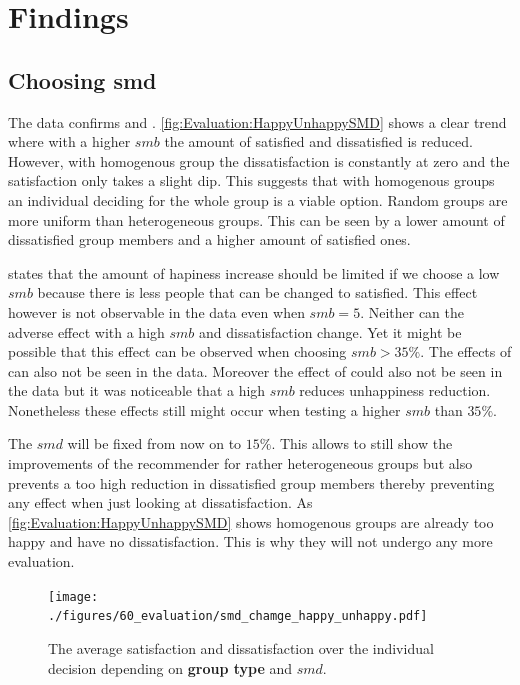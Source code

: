 \section{Findings}
\label{sec:Evaluation:Findings}

\subsection{Choosing smd}

The data confirms  and . \autoref{fig:Evaluation:HappyUnhappySMD} shows a clear trend where with a higher $smb$ the amount of satisfied and dissatisfied is reduced. However, with homogenous group the dissatisfaction is constantly at zero and the satisfaction only takes a slight dip. This suggests that with homogenous groups an individual deciding for the whole group is a viable option. Random groups are more uniform than heterogeneous groups. This can be seen by a lower amount of dissatisfied group members and a higher amount of satisfied ones.

 states that the amount of hapiness increase should be limited if we choose a low $smb$ because there is less people that can be changed to satisfied. This effect however is not observable in the data even when $smb = 5$. Neither can the adverse effect with a high $smb$ and dissatisfaction change. Yet it might be possible that this effect can be observed when choosing $smb > 35\%$. The effects of  can also not be seen in the data. Moreover the effect of  could also not be seen in the data but it was noticeable that a high $smb$ reduces unhappiness reduction. Nonetheless these effects still might occur when testing a higher $smb$ than $35\%$.

The $smd$ will be fixed from now on to $15\%$. This allows to still show the improvements of the recommender for rather heterogeneous groups but also prevents a too high reduction in dissatisfied group members thereby preventing any effect when just looking at dissatisfaction. As \autoref{fig:Evaluation:HappyUnhappySMD} shows homogenous groups are already too happy and have no dissatisfaction. This is why they will not undergo any more evaluation.

\begin{figure}
    \centering
    \texttt{[image: ./figures/60\_evaluation/smd\_chamge\_happy\_unhappy.pdf]}
    \caption{The average satisfaction and dissatisfaction over the individual decision depending on \textbf{group type} and $smd$.}
    \label{fig:Evaluation:HappyUnhappySMD}
\end{figure}

